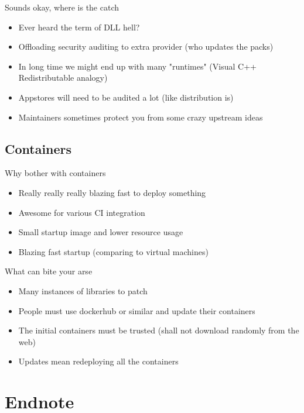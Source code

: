 \documentclass{beamer}
\begin{document}
\begin{frame}[t]{Sounds okay, where is the catch}
	\begin{itemize}
    \item Ever heard the term of DLL hell?
    \item Offloading security auditing to extra provider (who updates the packs)
    \item In long time we might end up with many "runtimes" (Visual C++ Redistributable analogy)
    \item Appstores will need to be audited a lot (like distribution is)
    \item Maintainers sometimes protect you from some crazy upstream ideas
	\end{itemize}
\end{frame}

\subsection{Containers}

\begin{frame}[t]{Why bother with containers}
    \begin{itemize}
	\item Really really really blazing fast to deploy something
	\item Awesome for various CI integration
	\item Small startup image and lower resource usage
	\item Blazing fast startup (comparing to virtual machines)
	\end{itemize}
\end{frame}

\begin{frame}[t]{What can bite your arse}
	\begin{itemize}
	\item Many instances of libraries to patch
	\item People must use dockerhub or similar and update their containers
	\item The initial containers must be trusted (shall not download randomly from the web)
	\item Updates mean redeploying all the containers
	\end{itemize}
\end{frame}

\section{Endnote}
\end{document}
